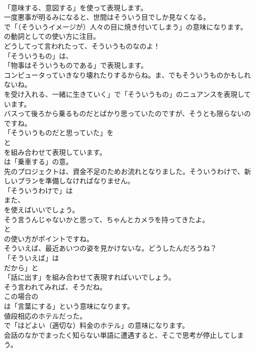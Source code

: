 \documentclass[8pt]{extreport}
\begin{document}
\begin{CJK}{UTF8}{min}
\\	「意味する、意図する」を使って表現します。	
\\	一度悪事が明るみになると、世間はそういう目でしか見なくなる。 
\\	で「（そういうイメージが）人々の目に焼き付いてしまう」の意味になります。
\\	の動詞としての使い方に注目。	
\\	どうしてって言われたって、そういうものなのよ！ 
\\	「そういうもの」は、
\\	「物事はそういうものである」で表現します。	
\\	コンピュータっていきなり壊れたりするからね。ま、でもそういうものかもしれないね。 
\\	を受け入れる、一緒に生きていく」で「そういうもの」のニュアンスを表現しています。	
\\	バスって後ろから乗るものだとばかり思っていたのですが、そうとも限らないのですね。 
\\	「そういうものだと思っていた」を 
\\	と 
\\	を組み合わせて表現しています。
\\	は「乗車する」の意。	
\\	先のプロジェクトは、資金不足のためお流れとなりました。そういうわけで、新しいプランを準備しなければなりません。 
\\	「そういうわけで」は
\\	また、
\\	を使えばいいでしょう。	
\\	そう言うんじゃないかと思って、ちゃんとカメラを持ってきたよ。 
\\	と
\\	の使い方がポイントですね。	
\\	そういえば、最近あいつの姿を見かけないな。どうしたんだろうね？ 
\\	「そういえば」は
\\	だから」と
\\	「話に出す」を組み合わせて表現すればいいでしょう。	
\\	そう言われてみれば、そうだね。 
\\	この場合の 
\\	は「言葉にする」という意味になります。	
\\	値段相応のホテルだった。 
\\	で「ほどよい（適切な）料金のホテル」の意味になります。	
\\	会話のなかでまったく知らない単語に遭遇すると、そこで思考が停止してしまう。 

\end{CJK}
\end{document}
